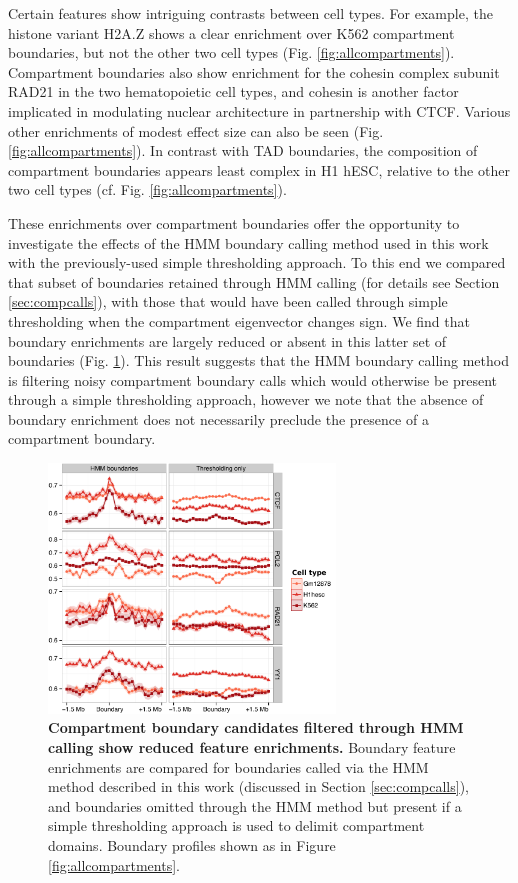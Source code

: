 \documentclass[a4paper,11pt,oneside]{book}
\begin{document}
Certain features show intriguing contrasts between cell types. For example, the
histone variant H2A.Z shows a clear enrichment over K562 compartment boundaries, but not the other two
cell types (Fig. \ref{fig:allcompartments}). Compartment
boundaries also show enrichment for the cohesin complex subunit RAD21
in the two hematopoietic cell types, and cohesin is
another factor implicated in modulating nuclear architecture in
partnership with CTCF.\cite{Zuin2013} Various other enrichments
of modest effect size can also be seen (Fig. \ref{fig:allcompartments}). In contrast with TAD boundaries, the
composition of compartment boundaries appears least complex in H1
hESC, relative to the other two cell types (cf. Fig. \ref{fig:allcompartments}). 

These enrichments over compartment boundaries offer the opportunity to investigate the effects of the HMM boundary calling method used in this work with the previously-used simple thresholding approach.\cite{Lieberman2009} To this end we compared that subset of boundaries retained through HMM calling (for details see Section \ref{sec:compcalls}), with those that would have been called through simple thresholding when the compartment eigenvector changes sign. We find that boundary enrichments are largely reduced or absent in this latter set of boundaries (Fig. \ref{fig:hmmVthres}). This result suggests that the HMM boundary calling method is filtering noisy compartment boundary calls which would otherwise be present through a simple thresholding approach, however we note that the absence of boundary enrichment does not necessarily preclude the presence of a compartment boundary.

\begin{figure}
\begin{center} 
\includegraphics[width=3in]{hmmVthres.pdf}
\captionsetup{width=\textwidth}
\caption[ Compartment boundary candidates filtered through HMM calling show reduced feature enrichments. ]{ {\bf Compartment boundary candidates filtered through HMM calling show reduced feature enrichments. }
Boundary feature enrichments are compared for boundaries called via the HMM method described in this work (discussed in Section \ref{sec:compcalls}), and boundaries omitted through the HMM method but present if a simple thresholding approach is used to delimit compartment domains. Boundary profiles shown as in Figure \ref{fig:allcompartments}.
}\label{fig:hmmVthres}
\end{center}
\end{figure} 
\end{document}
